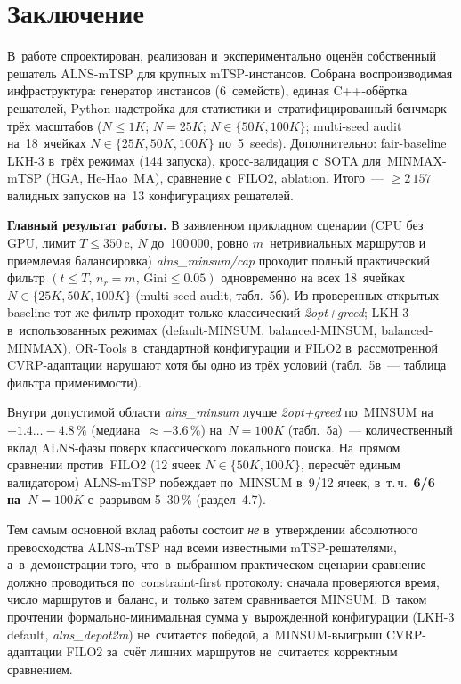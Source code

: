 \documentclass[a4paper,14pt]{extreport}
\begin{document}
\chapter{Заключение}

В~работе спроектирован, реализован и~экспериментально оценён собственный решатель ALNS-mTSP для крупных mTSP-инстансов. Собрана воспроизводимая инфраструктура: генератор инстансов (6~семейств), единая C++-обёртка решателей, Python-надстройка для статистики и~стратифицированный бенчмарк трёх масштабов ($N\leq 1K$; $N=25K$; $N\in\{50K,100K\}$; multi-seed audit на~18~ячейках $N\in\{25K,50K,100K\}$ по~5~seeds). Дополнительно: fair-baseline LKH-3 в~трёх режимах (144 запуска), кросс-валидация с~SOTA для~MINMAX-mTSP (HGA, He-Hao~MA), сравнение с~FILO2, ablation. Итого~--- $\geq 2\,157$ валидных запусков на~13 конфигурациях решателей.

\medskip
\textbf{Главный результат работы.} В заявленном прикладном сценарии (CPU без GPU, лимит $T\leq 350$\,c, $N$ до~100\,000, ровно $m$~нетривиальных маршрутов и приемлемая балансировка) \emph{alns\_minsum/cap} проходит полный практический фильтр $(t\leq T,\,n_r=m,\,\mathrm{Gini}\leq 0.05)$ одновременно на всех 18~ячейках $N\in\{25K,50K,100K\}$ (multi-seed audit, табл.~5б). Из проверенных открытых baseline тот же фильтр проходит только классический \emph{2opt+greed}; LKH-3 в~использованных режимах (default-MINSUM, balanced-MINSUM, balanced-MINMAX), OR-Tools в~стандартной конфигурации и FILO2 в~рассмотренной CVRP-адаптации нарушают хотя бы одно из трёх условий (табл.~5в~--- таблица фильтра применимости).

Внутри допустимой области \emph{alns\_minsum} лучше \emph{2opt+greed} по~MINSUM на~$-1.4\dots-4.8\,\%$ (медиана~$\approx -3.6\,\%$) на~$N=100K$ (табл.~5а)~--- количественный вклад ALNS-фазы поверх классического локального поиска. На~прямом сравнении против~FILO2 (12 ячеек $N\in\{50K,100K\}$, пересчёт единым валидатором) ALNS-mTSP побеждает по~MINSUM в~9/12 ячеек, в~т.\,ч.\ \textbf{6/6 на~$N=100K$} с~разрывом 5--30\,\% (раздел~4.7).

\medskip
\noindent Тем самым основной вклад работы состоит \emph{не} в~утверждении абсолютного превосходства ALNS-mTSP над всеми известными mTSP-решателями, а~в~демонстрации того, что~в~выбранном практическом сценарии сравнение должно проводиться по~constraint-first протоколу: сначала проверяются время, число маршрутов и~баланс, и~только затем сравнивается MINSUM. В~таком прочтении формально-минимальная сумма у~вырожденной конфигурации (LKH-3 default, \emph{alns\_depot2m}) не~считается победой, а~MINSUM-выигрыш CVRP-адаптации FILO2 за~счёт лишних маршрутов не~считается корректным сравнением.
\end{document}
